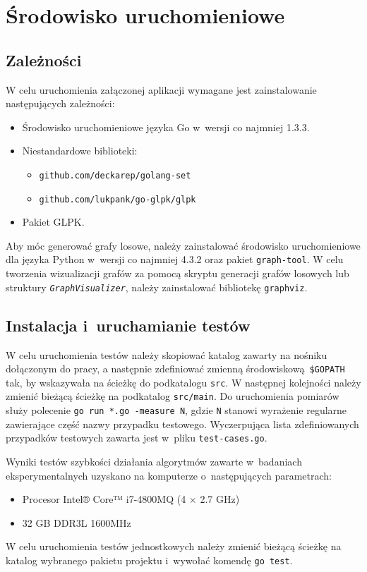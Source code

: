 \chapter{Środowisko uruchomieniowe}
\section{Zależności}
\par{
  W celu uruchomienia załączonej aplikacji wymagane jest zainstalowanie następujących zależności:
  \begin{itemize}
    \item Środowisko uruchomieniowe języka Go w~wersji co najmniej 1.3.3.
    \item Niestandardowe biblioteki:
    \begin{itemize}
      \item \texttt{github.com/deckarep/golang-set}
      \item \texttt{github.com/lukpank/go-glpk/glpk}
    \end{itemize}
    \item Pakiet GLPK.
  \end{itemize} 
  Aby móc generować grafy losowe, należy zainstalować środowisko uruchomieniowe dla języka Python w~wersji co najmniej 4.3.2 oraz pakiet \texttt{graph-tool}.
  W celu tworzenia wizualizacji grafów za pomocą skryptu generacji grafów losowych lub struktury \textit{\lstinline{GraphVisualizer}}, należy zainstalować bibliotekę \texttt{graphviz}.
}
\section{Instalacja i~uruchamianie testów}
\par{
  W celu uruchomienia testów należy skopiować katalog zawarty na nośniku dołączonym do pracy, a następnie zdefiniować zmienną środowiskową \texttt{\$GOPATH} tak, by wskazywała na ścieżkę do podkatalogu \texttt{src}.
  W następnej kolejności należy zmienić bieżącą ścieżkę na podkatalog \texttt{src/main}.
  Do uruchomienia pomiarów służy polecenie \texttt{go run *.go -measure N}, gdzie \texttt{N} stanowi wyrażenie regularne zawierające część nazwy przypadku testowego.
  Wyczerpująca lista zdefiniowanych przypadków testowych zawarta jest w~pliku \texttt{test-cases.go}.

  Wyniki testów szybkości działania algorytmów zawarte w~badaniach eksperymentalnych uzyskano na komputerze o~następujących parametrach:
  \begin{itemize}
    \item Procesor Intel® Core™ i7-4800MQ (4 $\times$ 2.7 GHz)
    \item 32 GB DDR3L 1600MHz
  \end{itemize}

  W celu uruchomienia testów jednostkowych należy zmienić bieżącą ścieżkę na katalog wybranego pakietu projektu i~wywołać komendę \texttt{go test}.
}
